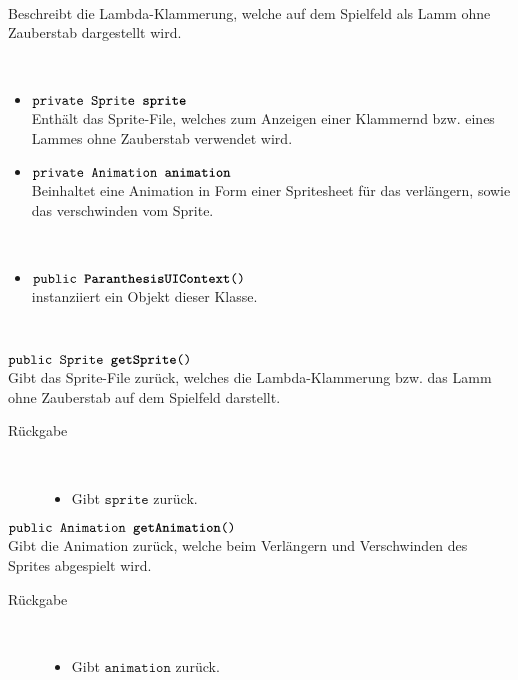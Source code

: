 \begin{description}
\item[Beschreibung] \hfill \\ Beschreibt die Lambda-Klammerung, welche auf dem Spielfeld als Lamm ohne Zauberstab dargestellt wird.
\item[Attribute] \hfill \\
	\vspace{-.8cm}
	\begin{itemize}	
		\item $\texttt{private Sprite \textbf{sprite}}$ \\ Enthält das Sprite-File, welches zum Anzeigen einer Klammernd bzw. eines Lammes ohne Zauberstab verwendet wird.
		\item $\texttt{private Animation \textbf{animation}}$ \\ Beinhaltet eine Animation in Form einer Spritesheet für das verlängern, sowie das verschwinden vom Sprite.
		\end{itemize}
	
\item[Konstruktoren] \hfill \\
	\vspace{-.8cm}
	\begin{itemize}
		\item $\texttt{public \textbf{ParanthesisUIContext}()}$ \\ instanziiert ein Objekt dieser Klasse.

	\end{itemize}
	
\item[Methoden] \hfill \\
	\vspace{-.8cm}
		\item $\texttt{public Sprite \textbf{getSprite}()}$ \\ Gibt das Sprite-File zurück, welches die Lambda-Klammerung bzw. das Lamm ohne Zauberstab auf dem Spielfeld darstellt.
		\begin{description}
			\item[Rückgabe] \hfill \\
			\vspace{-.8cm}
			\begin{itemize}
				\item Gibt $\texttt{sprite}$ zurück.
			\end{itemize}
			\end{description}
			
		\item $\texttt{public Animation \textbf{getAnimation}()}$ \\ Gibt die Animation zurück, welche beim Verlängern und Verschwinden des Sprites abgespielt wird.
		\begin{description}
			\item[Rückgabe] \hfill \\
			\vspace{-.8cm}
			\begin{itemize}
				\item Gibt $\texttt{animation}$ zurück.
			\end{itemize}
			\end{description}
			

\end{description}
